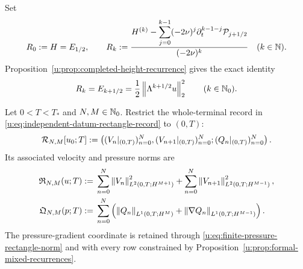 \begin{definition}
\label{u:def:completed-critical-height-coordinates}
Set
\begin{equation}
 R_0:=H=E_{1/2},
 \qquad
 R_k
 :=\frac{H^{(k)}-
   \displaystyle\sum_{j=0}^{k-1}(-2\nu)^j
   \partial_t^{k-1-j}\mathcal P_{j+1/2}}
 {(-2\nu)^k}
 \quad(k\in\mathbb N).
 \label{u:eq:completed-critical-coordinate}
\end{equation}
Proposition~\ref{u:prop:completed-height-recurrence} gives the exact identity
\begin{equation}
 R_k=E_{k+1/2}
 =\frac12\left\lVert \Lambda^{k+1/2}u\right\rVert_2^2
 \qquad(k\in\mathbb N_0).
 \label{u:eq:completed-critical-coordinate-identity}
\end{equation}
\par
\end{definition}

\begin{definition}
\label{u:def:finite-rectangle}
Let \(0<T<T_*\) and \(N,M\in\mathbb N_0\).  Restrict the whole-terminal record in
\eqref{u:eq:independent-datum-rectangle-record} to \((0,T)\):
\[
 \mathcal R_{N,M}[u_0;T]
 :=\left(
 (V_n|_{(0,T)})_{n=0}^{N},
 (V_{n+1}|_{(0,T)})_{n=0}^{N};
 (Q_n|_{(0,T)})_{n=0}^{N}
 \right).
\]
Its associated velocity and pressure norms are
\begin{align}
 \mathfrak R_{N,M}(u;T)
 :={}&\sum_{n=0}^{N}
 \left\lVert V_n\right\rVert_{L^2(0,T;H^{M+1})}^2
 +\sum_{n=0}^{N}
 \left\lVert V_{n+1}\right\rVert_{L^2(0,T;H^{M-1})}^2,
 \label{u:eq:finite-rectangle-norm}\\
 \mathfrak Q_{N,M}(p;T)
 :={}&\sum_{n=0}^{N}
 \left(
 \left\lVert Q_n\right\rVert_{L^1(0,T;H^M)}
 +\left\lVert \nabla Q_n\right\rVert_{L^1(0,T;H^{M-1})}
 \right).
 \label{u:eq:finite-pressure-rectangle-norm}
\end{align}
The pressure-gradient coordinate is retained through
\eqref{u:eq:finite-pressure-rectangle-norm} and with every row constrained by
Proposition~\ref{u:prop:formal-mixed-recurrences}.
\end{definition}

